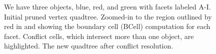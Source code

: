 \documentclass[final,3p,times,twocolumn]{elsarticle}
\begin{document}
\begin{figure}
  \caption{
    We have three objects, blue, red, and green with facets labeled A-I.
    \protect{} Initial pruned vertex quadtree.
    \protect{} Zoomed-in to the region outlined by red in \protect{} and showing the boundary cell (BCell) computation for each facet. %
    \protect{} Conflict cells, which intersect more than one object, are highlighted.
    \protect{} The new quadtree after conflict resolution.
  }
  \label{fig:conflict-find}
\end{figure}
\end{document}
